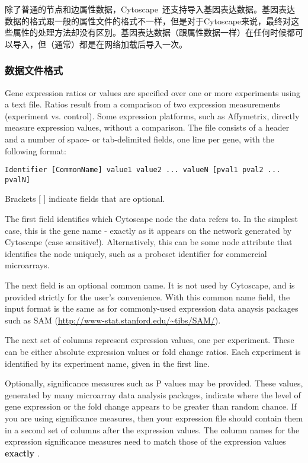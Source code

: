 除了普通的节点和边属性数据，Cytoscape~还支持导入基因表达数据。基因表达数据的格式跟一般的属性文件的格式不一样，但是对于Cytoscape来说，最终对这些属性的处理方法却没有区别。基因表达数据（跟属性数据一样）在任何时候都可以导入，但（通常）都是在网络加载后导入一次。 

 \subsubsection{数据文件格式}

 Gene expression ratios or values are specified over one or more experiments using a text file. Ratios result from a comparison of two expression measurements (experiment vs. control). Some expression platforms, such as Affymetrix, directly measure expression values, without a comparison. The file consists of a header and a number of space- or tab-delimited fields, one line per gene, with the following format: 

 \begin{verbatim}
Identifier [CommonName] value1 value2 ... valueN [pval1 pval2 ... pvalN]
\end{verbatim}

 Brackets [ ] indicate fields that are optional. 

 The first field identifies which Cytoscape node the data refers to. In the simplest case, this is the gene name - exactly as it appears on the network generated by Cytoscape (case sensitive!). Alternatively, this can be some node attribute that identifies the node uniquely, such as a probeset identifier for commercial microarrays. 

 The next field is an optional common name. It is not used by Cytoscape, and is provided strictly for the user's convenience. With this common name field, the input format is the same as for commonly-used expression data anaysis packages such as SAM (\url{http://www-stat.stanford.edu/~tibs/SAM/}). 

 The next set of columns represent expression values, one per experiment. These can be either absolute expression values or fold change ratios. Each experiment is identified by its experiment name, given in the first line. 

 Optionally, significance measures such as P values may be provided. These values, generated by many microarray data analysis packages, indicate where the level of gene expression or the fold change appears to be greater than random chance. If you are using significance measures, then your expression file should contain them in a second set of columns after the expression values. The column names for the expression significance measures need to match those of the expression values \textbf{exactly} . 

